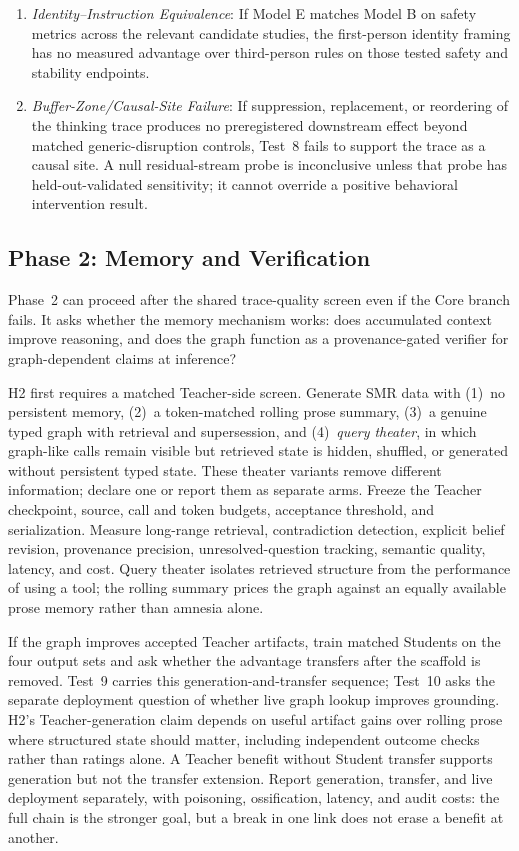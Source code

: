 \begin{enumerate}
    \item \emph{Identity--Instruction Equivalence}: If Model E matches
    Model B on safety metrics across the relevant candidate studies, the
    first-person identity framing has no measured advantage over third-person
    rules on those tested safety and stability endpoints.
    \item \emph{Buffer-Zone/Causal-Site Failure}: If suppression, replacement,
    or reordering of the thinking trace produces no preregistered downstream
    effect beyond matched generic-disruption controls, Test~8 fails to support
    the trace as a causal site. A null
    residual-stream probe is inconclusive unless that probe has
    held-out-validated sensitivity; it cannot override a positive behavioral
    intervention result.
\end{enumerate}


\subsection{Phase 2: Memory and Verification}

Phase~2 can proceed after the shared trace-quality screen even if the Core
branch fails. It asks whether the memory mechanism works: does accumulated context
improve reasoning, and does the graph function as a provenance-gated
verifier for graph-dependent claims at inference?

H2 first requires a matched Teacher-side screen. Generate SMR data with (1)~no
persistent memory, (2)~a token-matched rolling prose summary, (3)~a genuine typed
graph with retrieval and supersession, and (4)~\emph{query theater}, in which
graph-like calls remain visible but retrieved state is hidden, shuffled, or
generated without persistent typed state. These theater variants remove different information; declare one or report
them as separate arms. Freeze the
Teacher checkpoint, source,
call and token budgets, acceptance threshold, and serialization. Measure
long-range retrieval, contradiction detection, explicit belief revision,
provenance precision, unresolved-question tracking, semantic quality, latency,
and cost. Query theater isolates retrieved structure from the performance of
using a tool; the rolling summary prices the graph against an equally available
prose memory rather than amnesia alone.

If the graph improves accepted Teacher artifacts, train matched Students on the
four output sets and ask whether the advantage transfers after the scaffold is
removed. Test~9 carries this generation-and-transfer sequence; Test~10 asks the
separate deployment question of whether live graph lookup improves grounding.
H2's Teacher-generation claim depends on useful artifact gains over rolling
prose where structured state should matter, including independent outcome
checks rather than ratings alone. A Teacher benefit without Student transfer
supports generation but not the transfer extension. Report generation,
transfer, and live deployment separately, with poisoning, ossification,
latency, and audit costs: the full chain is the stronger goal, but a break in
one link does not erase a benefit at another.

